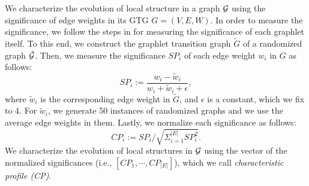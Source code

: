 We characterize the evolution of local structure in a graph $\mathcal{G}$ using the significance of edge weights in its GTG $G=(V,E,W)$. 
In order to measure the significance, we follow the steps in \cite{milo2004superfamilies} for measuring the significance of each graphlet itself.
To this end, we construct the graphlet transition graph $\tilde{G}$ of a randomized graph $\mathcal{\tilde{G}}$.
Then, we measure the significance $SP_i$ of each edge weight $w_i$ in $G$ as follows:
\begin{equation}\label{eq1}
    SP_i := \frac{w_i - \tilde{w}_i}{w_i+\tilde{w}_i + \epsilon},
\end{equation}
where $\tilde{w}_i$ is the corresponding edge weight in $\tilde{G}$, and $\epsilon$ is a constant, which we fix to $4$. For $\tilde{w}_i$, we generate 50 instances of randomized graphs and we use the average edge weights in them. Lastly, we normalize each significance as follows:
\begin{equation}\label{eq2}
    CP_{i} := {SP_{i}}/{\sqrt{\Sigma_{i=1}^{|E|} SP_{i}^2}}.
\end{equation} 
We characterize the evolution of local structures in $\mathcal{G}$ using the vector of the normalized significances (i.e., $[CP_1,\cdots,CP_{|E|}]$), which we call  \textit{characteristic profile (CP)}.



